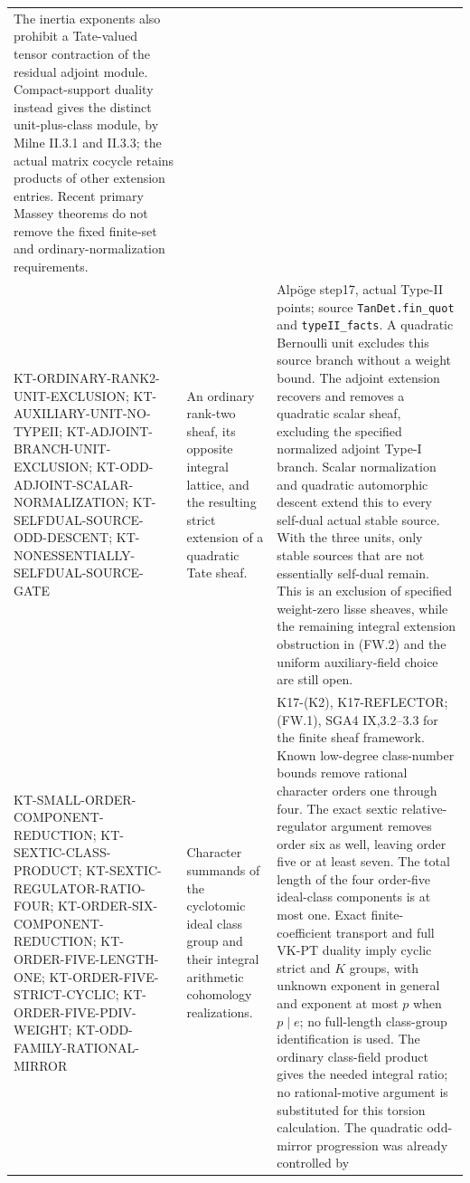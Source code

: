 \begin{longtable}{>{\raggedright\arraybackslash}p{}
>{\raggedright\arraybackslash}p{}
>{\raggedright\arraybackslash}p{}}
The inertia exponents also prohibit a Tate-valued tensor contraction
of the residual adjoint module. Compact-support duality instead
gives the distinct unit-plus-class module, by Milne II.3.1 and II.3.3;
the actual matrix cocycle retains products of other extension entries.
Recent primary Massey theorems do not remove the fixed finite-set
and ordinary-normalization requirements.\\
KT-ORDINARY-RANK2-UNIT-EXCLUSION;
KT-AUXILIARY-UNIT-NO-TYPEII; KT-ADJOINT-BRANCH-UNIT-EXCLUSION;
KT-ODD-ADJOINT-SCALAR-NORMALIZATION;
KT-SELFDUAL-SOURCE-ODD-DESCENT;
KT-NONESSENTIALLY-SELFDUAL-SOURCE-GATE &
An ordinary rank-two sheaf, its opposite integral lattice,
and the resulting strict extension of a quadratic Tate sheaf. &
Alp\"oge step17, actual Type-II points; source
\texttt{TanDet.fin\_quot} and \texttt{typeII\_facts}.
A quadratic Bernoulli unit excludes this source branch
without a weight bound. The adjoint extension recovers and
removes a quadratic scalar sheaf, excluding the specified
normalized adjoint Type-I branch. Scalar normalization and
quadratic automorphic descent extend this to every self-dual
actual stable source. With the three units, only stable
sources that are not essentially self-dual remain. This is
an exclusion of specified weight-zero lisse sheaves, while
the remaining integral extension obstruction in (FW.2)
and the uniform auxiliary-field choice are still open.\\
KT-SMALL-ORDER-COMPONENT-REDUCTION;
KT-SEXTIC-CLASS-PRODUCT;
KT-SEXTIC-REGULATOR-RATIO-FOUR;
KT-ORDER-SIX-COMPONENT-REDUCTION;
KT-ORDER-FIVE-LENGTH-ONE;
KT-ORDER-FIVE-STRICT-CYCLIC;
KT-ORDER-FIVE-PDIV-WEIGHT;
KT-ODD-FAMILY-RATIONAL-MIRROR &
Character summands of the cyclotomic ideal class group and
their integral arithmetic cohomology realizations. &
K17-(K2), K17-REFLECTOR; (FW.1), SGA4 IX,3.2--3.3 for the
finite sheaf framework. Known low-degree class-number bounds
remove rational character orders one through four. The exact
sextic relative-regulator argument removes order six as well,
leaving order five or at least seven. The total length of the
four order-five ideal-class components is at most one. Exact
finite-coefficient transport and full VK-PT duality imply cyclic
strict and $K$ groups, with unknown exponent in general and
exponent at most $p$ when $p\mid e$; no full-length
class-group identification is used. The ordinary class-field
product gives the needed integral ratio; no rational-motive
argument is substituted for this torsion calculation. The
quadratic odd-mirror progression was already controlled by

\end{longtable}
